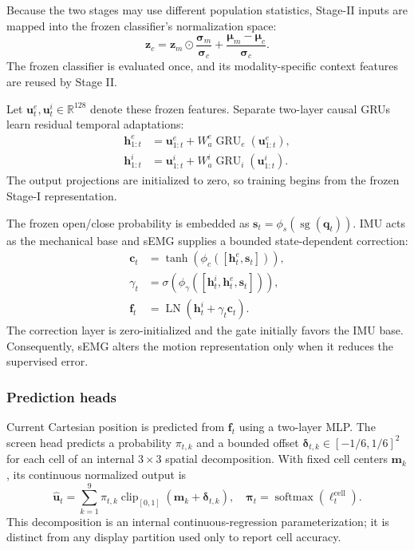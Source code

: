 Because the two stages may use different population statistics, Stage-II
inputs are mapped into the frozen classifier's normalization space:
\begin{equation}
 \mathbf z_c=\mathbf z_m\odot
 \frac{\boldsymbol\sigma_m}{\boldsymbol\sigma_c}
 +\frac{\boldsymbol\mu_m-\boldsymbol\mu_c}
       {\boldsymbol\sigma_c}.
\end{equation}
The frozen classifier is evaluated once, and its modality-specific context
features are reused by Stage II.

Let $\mathbf u^e_t,\mathbf u^i_t\in\mathbb R^{128}$ denote these frozen
features. Separate two-layer causal GRUs learn residual temporal adaptations:
\begin{align}
 \mathbf h^e_{1:t}&=\mathbf u^e_{1:t}
 +W^e_a\operatorname{GRU}_e(\mathbf u^e_{1:t}),\\
 \mathbf h^i_{1:t}&=\mathbf u^i_{1:t}
 +W^i_a\operatorname{GRU}_i(\mathbf u^i_{1:t}).
\end{align}
The output projections are initialized to zero, so training begins from the
frozen Stage-I representation.

The frozen open/close probability is embedded as
$\mathbf s_t=\phi_s(\operatorname{sg}(\mathbf q_t))$. IMU acts as the
mechanical base and sEMG supplies a bounded state-dependent correction:
\begin{align}
 \mathbf c_t&=\tanh\!\left(
 \phi_c([\mathbf h^e_t,\mathbf s_t])\right),\\
 \gamma_t&=\sigma\!\left(
 \phi_\gamma([\mathbf h^i_t,\mathbf h^e_t,\mathbf s_t])\right),\\
 \mathbf f_t&=\operatorname{LN}
 (\mathbf h^i_t+\gamma_t\mathbf c_t).
\end{align}
The correction layer is zero-initialized and the gate initially favors the IMU
base. Consequently, sEMG alters the motion representation only when it reduces
the supervised error.

\subsubsection{Prediction heads}

Current Cartesian position is predicted from $\mathbf f_t$ using a two-layer
MLP. The screen head predicts a probability $\pi_{t,k}$ and a bounded offset
$\boldsymbol\delta_{t,k}\in[-1/6,1/6]^2$ for each cell of an internal
$3\times3$ spatial decomposition. With fixed cell centers $\mathbf m_k$, its
continuous normalized output is
\begin{equation}
 \hat{\mathbf u}_t=\sum_{k=1}^{9}\pi_{t,k}
 \operatorname{clip}_{[0,1]}
 (\mathbf m_k+\boldsymbol\delta_{t,k}),
 \quad
 \boldsymbol\pi_t=\operatorname{softmax}
 (\boldsymbol\ell^{\mathrm{cell}}_t).
\end{equation}
This decomposition is an internal continuous-regression parameterization; it
is distinct from any display partition used only to report cell accuracy.

